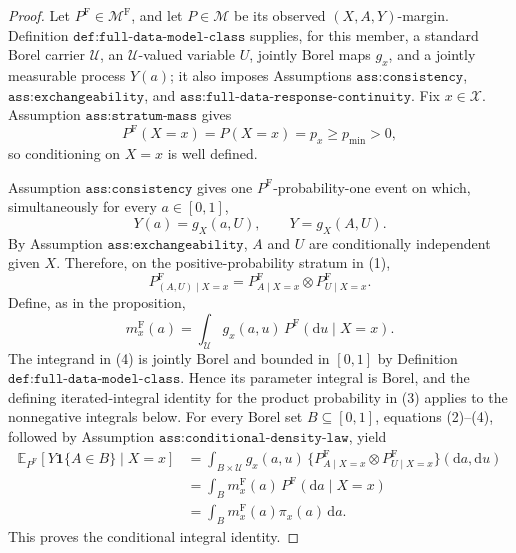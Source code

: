 \documentclass{article}
\begin{document}
\begin{proof}
Let \(P^{\mathrm F}\in\mathcal M^{\mathrm F}\), and let \(P\in\mathcal M\) be its observed \((X,A,Y)\)-margin.  Definition \(\texttt{def:full-data-model-class}\) supplies, for this member, a standard Borel carrier \(\mathcal U\), an \(\mathcal U\)-valued variable \(U\), jointly Borel maps \(g_x\), and a jointly measurable process \(Y(a)\); it also imposes Assumptions \(\texttt{ass:consistency}\), \(\texttt{ass:exchangeability}\), and \(\texttt{ass:full-data-response-continuity}\).  Fix \(x\in\mathcal X\).  Assumption \(\texttt{ass:stratum-mass}\) gives
\[
 P^{\mathrm F}(X=x)=P(X=x)=p_x\geq p_{\min}>0,
 \tag{1}
\]
so conditioning on \(X=x\) is well defined.

Assumption \(\texttt{ass:consistency}\) gives one \(P^{\mathrm F}\)-probability-one event on which, simultaneously for every \(a\in[0,1]\),
\[
 Y(a)=g_X(a,U),
 \qquad
 Y=g_X(A,U).
 \tag{2}
\]
By Assumption \(\texttt{ass:exchangeability}\), \(A\) and \(U\) are conditionally independent given \(X\).  Therefore, on the positive-probability stratum in (1),
\[
 P^{\mathrm F}_{(A,U)\mid X=x}
 =P^{\mathrm F}_{A\mid X=x}\otimes P^{\mathrm F}_{U\mid X=x}.
 \tag{3}
\]
Define, as in the proposition,
\[
 m_x^{\mathrm F}(a)
 =\int_{\mathcal U}g_x(a,u)\,P^{\mathrm F}(\mathrm du\mid X=x).
 \tag{4}
\]
The integrand in (4) is jointly Borel and bounded in \([0,1]\) by Definition \(\texttt{def:full-data-model-class}\).  Hence its parameter integral is Borel, and the defining iterated-integral identity for the product probability in (3) applies to the nonnegative integrals below.  For every Borel set \(B\subseteq[0,1]\), equations (2)--(4), followed by Assumption \(\texttt{ass:conditional-density-law}\), yield
\[
\begin{aligned}
 \mathbb E_{P^{\mathrm F}}[Y\mathbf 1\{A\in B\}\mid X=x]
 &=\int_{B\times\mathcal U}g_x(a,u)\,
   \{P^{\mathrm F}_{A\mid X=x}\otimes P^{\mathrm F}_{U\mid X=x}\}
   (\mathrm da,\mathrm du)\\
 &=\int_Bm_x^{\mathrm F}(a)\,P^{\mathrm F}(\mathrm da\mid X=x)\\
 &=\int_Bm_x^{\mathrm F}(a)\pi_x(a)\,\mathrm da.
\end{aligned}
\tag{5}
\]
This proves the conditional integral identity.


\end{proof}
\end{document}

